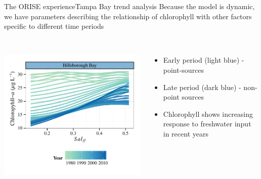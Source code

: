 \documentclass[serif]{beamer}\usepackage[]{graphicx}\usepackage[]{color}
\begin{document}
\begin{frame}{The ORISE experience}{Tampa Bay trend analysis}
Because the model is dynamic, we have parameters describing the relationship of chlorophyll with other factors specific to different time periods \\~\\
\begin{columns}[T]
\begin{column}{0.45\textwidth}
\includegraphics[width = \textwidth]{fig/hill-1.pdf}
\end{column}
\begin{column}{0.45\textwidth}
\begin{itemize}
\item Early period (light blue) - point-sources
\item Late period (dark blue) - non-point sources
\item Chlorophyll shows increasing response to freshwater input in recent years
\end{itemize}
\end{column}
\end{columns}
\end{frame}
\end{document}
